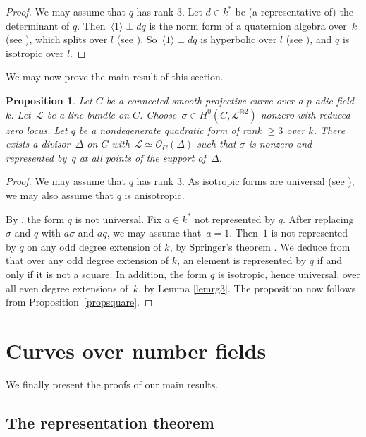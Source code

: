 \documentclass{amsart}
\newtheorem{prop}[thm]{Proposition}
\theoremstyle{definition}
\theoremstyle{remark}
\numberwithin{equation}{section}
\def\cL{\mathcal{L}}
\def\cO{\mathcal{O}}
\begin{document}
\begin{proof}
We may assume that $q$ has rank $3$.
Let $d\in k^*$ be (a representative of) the determinant of $q$. Then~${\langle 1\rangle\perp dq}$ is the norm form of a quaternion algebra over~$k$ (see \cite[III.2]{Lam}), which splits over $l$ (see \cite[XIII.3,~Proposition~7]{Corpslocaux}). So~${\langle 1\rangle\perp dq}$ is hyperbolic over $l$ (see \cite[III.2.7]{Lam}), and $q$ is isotropic over $l$.
\end{proof}

We may now prove the main result of this section.

\begin{prop}
\label{propmiracle}
Let $C$ be a connected smooth projective curve over a $p$-adic field~$k$. Let~$\cL$ be a line bundle on $C$. Choose~$\sigma\in H^0(C,\cL^{\otimes 2})$ nonzero with reduced zero locus.
Let $q$ be a nondegenerate quadratic form of rank $\geq 3$ over $k$. 
There exists a divisor~$\Delta$ on $C$ with~$\cL\simeq\cO_C(\Delta)$ such that $\sigma$ is nonzero and represented by~$q$ at all points of the support of~$\Delta$.
\end{prop}

\begin{proof}
We may assume that $q$ has rank $3$. As isotropic forms are universal (see \cite[I.3.4]{Lam}), we may also assume that $q$ is anisotropic.

 By \cite[VI.2.15\,(2)]{Lam}, the form $q$ is not universal. Fix $a\in k^*$ not represented by $q$. 
After replacing $\sigma$ and $q$ with $a\sigma$ and $aq$, we may assume that~$a=1$.
Then~$1$ is not represented by $q$ on any odd degree extension of $k$, by Springer's theorem \cite[VII.2.9]{Lam}. We deduce from \cite[VI.2.15\,(2)]{Lam} that 
over any odd degree extension of $k$, an element is represented by $q$ if and only if it is not a square. 
In addition, the form $q$ is isotropic, hence universal, over all even degree extensions of~$k$, by Lemma \ref{lemrg3}.
The proposition now follows from Proposition~\ref{propsquare}.
\end{proof}


\section{Curves over number fields}
\label{secglobal}

We finally present the proofs of our main results.


\subsection{The representation theorem}
\label{parPourchet}
\end{document}
